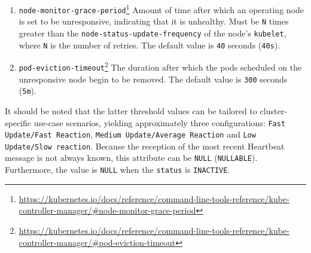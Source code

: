 \begin{itemize}
\begin{enumerate}
      \item \texttt{node-monitor-grace-period}\footnote{\url{https://kubernetes.io/docs/reference/command-line-tools-reference/kube-controller-manager/\#node-monitor-grace-period}}
        \newline
        Amount of time after which an operating node is set to be unresponsive, indicating
        that it is unhealthy. Must be \texttt{N} times greater than the \texttt{node-status-update-frequency}
        of the node's \texttt{kubelet}, where \texttt{N} is the number of retries.
        \newline
        The default value is \texttt{40} seconds (\texttt{40s}).

      \item \texttt{pod-eviction-timeout}\footnote{\url{https://kubernetes.io/docs/reference/command-line-tools-reference/kube-controller-manager/\#pod-eviction-timeout}}
        \newline
        The duration after which the pods scheduled on the unresponsive node
        begin to be removed.
        \newline
        The default value is \texttt{300} seconds (\texttt{5m}).
    \end{enumerate}
    It should be noted that the latter threshold values can be tailored to
    cluster-specific use-case scenarios, yielding approximately three configurations:
    \texttt{Fast Update/Fast Reaction}, \texttt{Medium Update/Average Reaction} and
    \texttt{Low Update/Slow reaction}\cite{k8s_reliability}.
    \newline
    Because the reception of the most recent Heartbeat message is not always
    known, this attribute can be \texttt{NULL} (\texttt{NULLABLE}). Furthermore,
    the value is \texttt{NULL} when the \texttt{status} is \texttt{INACTIVE}.


\end{itemize}
